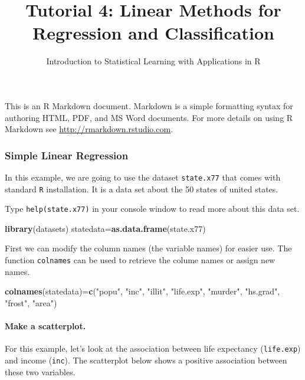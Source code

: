 \documentclass[]{article}
\title{Tutorial 4: Linear Methods for Regression and Classification}
\author{Introduction to Statistical Learning with Applications in R}
\date{}
\newenvironment{Shaded}{\begin{snugshade}}{\end{snugshade}}
\newcommand{\KeywordTok}[1]{\textcolor[rgb]{0.13,0.29,0.53}{\textbf{#1}}}
\newcommand{\StringTok}[1]{\textcolor[rgb]{0.31,0.60,0.02}{#1}}
\newcommand{\NormalTok}[1]{#1}
\let\oldparagraph\paragraph
\renewcommand{\paragraph}[1]{\oldparagraph{#1}\mbox{}}
\begin{document}
\maketitle

This is an R Markdown document. Markdown is a simple formatting syntax
for authoring HTML, PDF, and MS Word documents. For more details on
using R Markdown see \url{http://rmarkdown.rstudio.com}.

\subsubsection{Simple Linear Regression}\label{simple-linear-regression}

In this example, we are going to use the dataset \texttt{state.x77} that
comes with standard \texttt{R} installation. It is a data set about the
50 states of united states.

Type \texttt{help(state.x77)} in your console window to read more about
this data set.

\begin{Shaded}
\begin{Highlighting}[]
\KeywordTok{library}\NormalTok{(datasets)}
\NormalTok{statedata=}\KeywordTok{as.data.frame}\NormalTok{(state.x77)}
\end{Highlighting}
\end{Shaded}

First we can modify the column names (the variable names) for easier
use. The function \texttt{colnames} can be used to retrieve the colume
names or assign new names.

\begin{Shaded}
\begin{Highlighting}[]
\KeywordTok{colnames}\NormalTok{(statedata)=}\KeywordTok{c}\NormalTok{(}\StringTok{"popu"}\NormalTok{, }\StringTok{"inc"}\NormalTok{, }\StringTok{"illit"}\NormalTok{, }\StringTok{"life.exp"}\NormalTok{, }\StringTok{"murder"}\NormalTok{, }\StringTok{"hs.grad"}\NormalTok{, }\StringTok{"frost"}\NormalTok{, }\StringTok{"area"}\NormalTok{)}
\end{Highlighting}
\end{Shaded}

\paragraph{Make a scatterplot.}\label{make-a-scatterplot.}

For this example, let's look at the association between life expectancy
(\texttt{life.exp}) and income (\texttt{inc}). The scatterplot below
shows a positive association between these two variables.
\end{document}
